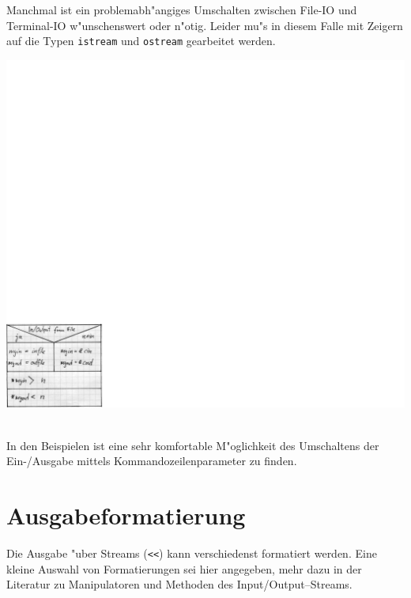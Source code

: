\begin{minipage}{0.5\textwidth}
Manchmal ist ein problemabh"angiges Umschalten zwischen File-IO und
Terminal-IO w"unschenswert oder n"otig.
Leider mu"s in diesem Falle mit Zeigern auf die Typen
\verb|istream| und \verb|ostream| gearbeitet werden.
\end{minipage} \hfill
\begin{minipage}{0.45\textwidth}
  \includegraphics[scale=0.5]{GIF/p99}
\end{minipage}  
\\
In den Beispielen ist
eine sehr komfortable M"oglichkeit des Umschaltens der Ein-/Ausgabe
mittels Kommandozeilenparameter zu finden.
%
%
%
\section{Ausgabeformatierung}
\label{p:8.4}
%
Die Ausgabe "uber Streams (\verb|<<|) kann verschiedenst formatiert
werden. Eine kleine Auswahl von Formatierungen sei hier angegeben,
mehr dazu in der Literatur \cite[\S7.2]{Wolf:2006:CAZ}
zu Manipulatoren und Methoden des
Input/Output--Streams.
%

